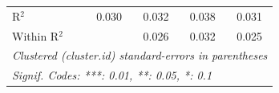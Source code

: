 \documentclass[
]{article}
\begin{document}
\begin{table}[htbp]
\begin{tabular}{lcccc}
   R$^2$                                                  & 0.030          & 0.032   & 0.038         & 0.031\\  
   Within R$^2$                                           &                & 0.026   & 0.032         & 0.025\\  
   \midrule \midrule
   \multicolumn{5}{l}{\emph{Clustered (cluster.id) standard-errors in parentheses}}\\
   \multicolumn{5}{l}{\emph{Signif. Codes: ***: 0.01, **: 0.05, *: 0.1}}\\
\end{tabular}
\par\endgroup


\end{table}
\begin{table}[htbp]


\end{table}
\end{document}
